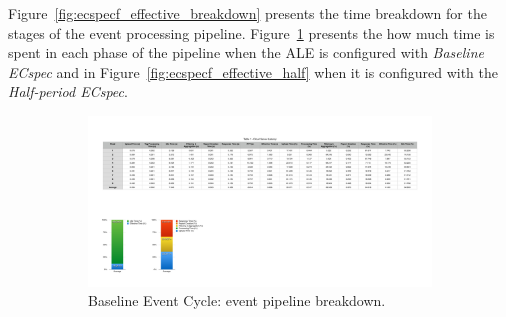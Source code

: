Figure~\ref{fig:ecspecf_effective_breakdown} presents the time breakdown for the stages of the
event processing pipeline. Figure~\ref{fig:ecspecf_effective_base} presents the how much time is spent
in each phase of the pipeline when the \gls{ALE} is configured with \textit{Baseline ECspec} and in
Figure~\ref{fig:ecspecf_effective_half} when it is configured with the \textit{Half-period ECspec}.\\

\begin{figure}[ht!]
  \centering
  \begin{subfigure}{.5\textwidth}
    \centering
    \includegraphics[height=\linewidth]{./images/cloud_ecspec_effective_breakdown}
    \caption{Baseline Event Cycle: event pipeline breakdown.}
    \label{fig:ecspecf_effective_base}
  \end{subfigure}%
  \begin{subfigure}{.5\textwidth}
    \centering

\end{subfigure}
\end{figure}
